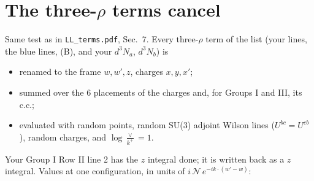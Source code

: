 \documentclass[10pt]{article}
\numberwithin{equation}{section}
\begin{document}
\section{The three-\texorpdfstring{$\rho$}{rho} terms cancel}\label{sec:three}
Same test as in \texttt{LL\_terms.pdf}, Sec.~7. Every three-$\rho$ term of the list (your lines, the blue lines, (B), and your $d^3N_a$, $d^3N_b$) is
\begin{itemize}
\item renamed to the frame $w,w',z$, charges $x,y,x'$;
\item summed over the 6 placements of the charges and, for Groups I and III, its c.c.;
\item evaluated with random points, random SU(3) adjoint Wilson lines ($U^{bc}=U^{cb}$), random charges, and $\log\frac{\vee}{k^+}=1$.
\end{itemize}
Your Group I Row II line 2 has the $z$ integral done; it is written back as a $z$ integral. Values at one configuration, in units of $i\,\mathcal N\,e^{-ik\cdot(w'-w)}$:
\end{document}

